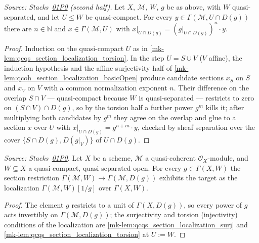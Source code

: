 \begin{lemma}
  \label{mk-lem:qcqs_section_localization_surj}
  \leanok

  \textit{Source: Stacks~\href{https://stacks.math.columbia.edu/tag/01P0}{01P0}
  (second half).}
  Let $X$, $\mathcal{M}$, $W$, $g$ be as above, with $W$ quasi-separated, and
  let $U \le W$ be quasi-compact. For every
  $y \in \Gamma(\mathcal{M}, U \cap D(g))$ there are $n \in \mathbb{N}$ and
  $x \in \Gamma(\mathcal{M}, U)$ with
  $x|_{U \cap D(g)} = (g|_{U \cap D(g)})^n \cdot y$.
\end{lemma}
\begin{proof}
  \leanok
  Induction on the quasi-compact $U$ as in
  \ref{mk-lem:qcqs_section_localization_torsion}. In the step $U = S \cup V$
  ($V$ affine), the induction hypothesis and the affine surjectivity half of
  \ref{mk-lem:qcoh_section_localization_basicOpen} produce candidate sections
  $x_S$ on $S$ and $x_V$ on $V$ with a common normalization exponent $n$.
  Their difference on the overlap $S \cap V$ --- quasi-compact because $W$ is
  quasi-separated --- restricts to zero on $(S \cap V) \cap D(g)$, so by the
  torsion half a further power $g^m$ kills it; after multiplying both
  candidates by $g^m$ they agree on the overlap and glue to a section $x$
  over $U$ with $x|_{U \cap D(g)} = g^{n+m} \cdot y$, checked by sheaf
  separation over the cover $\{S \cap D(g), D(g|_V)\}$ of $U \cap D(g)$.
\end{proof}

\begin{lemma}
  \label{mk-lem:qcqs_section_localization}
  \leanok

  \textit{Source: Stacks~\href{https://stacks.math.columbia.edu/tag/01P0}{01P0}.}
  Let $X$ be a scheme, $\mathcal{M}$ a quasi-coherent $\mathcal{O}_X$-module,
  and $W \subseteq X$ a quasi-compact, quasi-separated open. For every
  $g \in \Gamma(X, W)$ the section restriction
  $\Gamma(\mathcal{M}, W) \to \Gamma(\mathcal{M}, D(g))$ exhibits the target
  as the localization $\Gamma(\mathcal{M}, W)[1/g]$ over $\Gamma(X, W)$.
\end{lemma}
\begin{proof}
  \leanok
  The element $g$ restricts to a unit of $\Gamma(X, D(g))$, so every power of
  $g$ acts invertibly on $\Gamma(\mathcal{M}, D(g))$; the surjectivity and
  torsion (injectivity) conditions of the localization are
  \ref{mk-lem:qcqs_section_localization_surj} and
  \ref{mk-lem:qcqs_section_localization_torsion} at $U := W$.
\end{proof}

